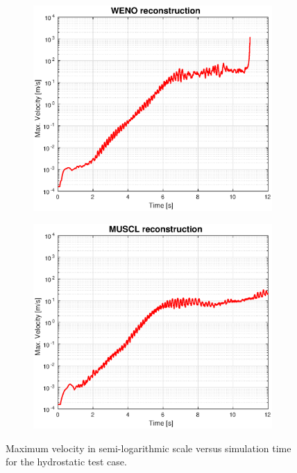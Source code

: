 \documentclass[11pt, a4paper, oneside, openany]{book}
\begin{document}
\begin{figure}[!ht]
	\centering
	\begin{subfigure}{.5\textwidth}
		\includegraphics[width=1\textwidth]{Hydrostatic_WENOTime.eps}
		\caption[Hydrostatic ]{}\label{HydrostaticTimeWENO}
	\end{subfigure}%
	\begin{subfigure}{.5\textwidth}
		\includegraphics[width=1\textwidth]{Hydrostatic_MUSCLTime.eps}
		\caption[Poisson Convergence 2020 code]{}\label{HydrostaticTimeMUSCL}
	\end{subfigure}
	\caption[Poisson equation convergence study]{Maximum velocity in semi-logarithmic scale versus simulation time for the hydrostatic test case.}\label{HydrostaticTime}
\end{figure}\noindent
\end{document}

